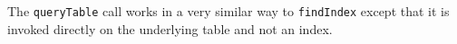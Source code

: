 The \verb+queryTable+ call works in a very similar way to \verb+findIndex+ except that it is
invoked directly on the underlying table and not an index.

